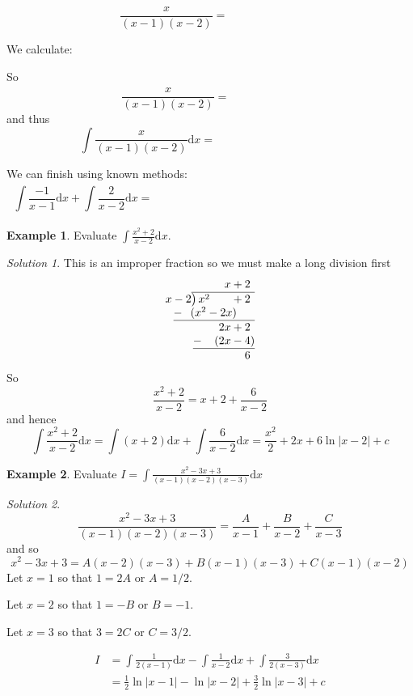 \documentclass[
  english,
  11pt,
  oneside]{book}
\newcommand{\slide}{}
\theoremstyle{definition}
\theoremstyle{definition}
\newtheorem{example}{Example}[chapter]
\theoremstyle{definition}
\theoremstyle{definition}
\theoremstyle{remark}
\newtheorem*{solution}{Solution}
\begin{document}
\begin{slidesonly}

\[
\frac{x}{(x-1)(x-2)} = \phantom{\frac A{x-1}+\frac B{x-2}.}
\]
\slide

We calculate:

\vfill

So
\[
\frac{x}{(x-1)(x-2)} = \phantom{\frac {-1}{x-1}+\frac 2{x-2}}
\]
and thus
\[
\int\frac{x}{(x-1)(x-2)}\mathrm{d}x = \phantom{\int\frac {-1}{x-1}\mathrm{d}x+\int\frac 2{x-2}\mathrm{d}x}
\]
\slide
We can finish using known methods:
\[
\int\frac {-1}{x-1}\mathrm{d}x+\int\frac 2{x-2}\mathrm{d}x = \phantom{-\ln|x-1|+2\ln|x-2|+c = \ln\left|\frac{(x-2)^2}{x-1}\right|+c.}
\]
\slide

\end{slidesonly}

\begin{example}
Evaluate \(\displaystyle\int\frac{x^2+2}{x-2}\mathrm{d}x\).
\end{example}

\begin{solution}
This is an improper fraction so we must make a long division first
\[
\begin{array}{r}
x+2\phantom{)}   \\
x-2{\overline{\smash{\big)}\,x^2\phantom{+2x}+2\phantom{)}}}\\
\underline{-~\phantom{(}(x^2-2x)\phantom{-b)}}\\
\phantom{0+}2x+2\phantom{)}\\ 
\underline{-~\phantom{()}(2x-4)}\\ 
\phantom{0+}6\phantom{)}
\end{array}
\]
So
\[
\frac{x^2+2}{x-2} = x+2+\frac6{x-2}
\]
and hence
\[
\int\frac{x^2+2}{x-2}\mathrm{d}x = \int (x+2)\mathrm{d}x+\int\frac6{x-2}\mathrm{d}x = \frac{x^2}{2}+2x+6\ln|x-2|+c
\]
\end{solution}

\slide

\begin{example}
Evaluate \(I = \displaystyle\int\frac{x^2-3x+3}{(x-1)(x-2)(x-3)} \mathrm{d}x\)
\end{example}

\begin{solution}
\[
\frac{x^2-3x+3}{(x-1)(x-2)(x-3)} = \frac A{x-1}+\frac B{x-2}+\frac C{x-3}
\]
and so
\[
x^2-3x+3 = A(x-2)(x-3) + B(x-1)(x-3) + C(x-1)(x-2)
\]
Let \(x=1\) so that \(1=2A\) or \(A=1/2\).

Let \(x=2\) so that \(1=-B\) or \(B=-1\).

Let \(x=3\) so that \(3=2C\) or \(C=3/2\).

\begin{align*}
I&= \int\frac 1{2(x-1)}\mathrm{d}x-\int\frac 1{x-2}\mathrm{d}x+\int\frac 3{2(x-3)}\mathrm{d}x\\
&=\frac 12\ln|x-1| -\ln|x-2| + \frac 32\ln|x-3|+c
\end{align*}
\end{solution}
\end{document}
